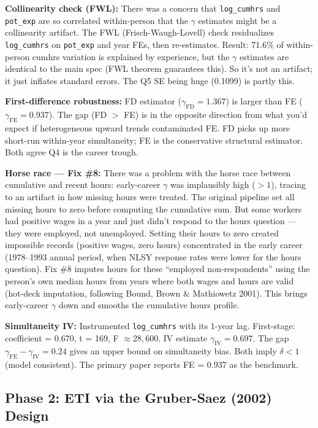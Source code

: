 \documentclass[11pt, letterpaper]{article}
\newcommand{\codebox}[1]{\texttt{\small #1}}
\begin{document}
\textbf{Collinearity check (FWL):} There was a concern that \codebox{log\_cumhrs} and \codebox{pot\_exp} are so correlated within-person that the $\gamma$ estimates might be a collinearity artifact. The FWL (Frisch-Waugh-Lovell) check residualizes \codebox{log\_cumhrs} on \codebox{pot\_exp} and year FEs, then re-estimates. Result: 71.6\% of within-person cumhrs variation is explained by experience, but the $\gamma$ estimates are identical to the main spec (FWL theorem guarantees this). So it's not an artifact; it just inflates standard errors. The Q5 SE being huge (0.1099) is partly this.

\textbf{First-difference robustness:} FD estimator ($\gamma_\text{FD} = 1.367$) is larger than FE ($\gamma_\text{FE} = 0.937$). The gap (FD $>$ FE) is in the opposite direction from what you'd expect if heterogeneous upward trends contaminated FE. FD picks up more short-run within-year simultaneity; FE is the conservative structural estimator. Both agree Q4 is the career trough.

\textbf{Horse race --- Fix \#8:} There was a problem with the horse race between cumulative and recent hours: early-career $\gamma$ was implausibly high ($> 1$), tracing to an artifact in how missing hours were treated. The original pipeline set all missing hours to zero before computing the cumulative sum. But some workers had positive wages in a year and just didn't respond to the hours question --- they were employed, not unemployed. Setting their hours to zero created impossible records (positive wages, zero hours) concentrated in the early career (1978--1993 annual period, when NLSY response rates were lower for the hours question). Fix \#8 imputes hours for these ``employed non-respondents'' using the person's own median hours from years where both wages and hours are valid (hot-deck imputation, following Bound, Brown \& Mathiowetz 2001). This brings early-career $\gamma$ down and smooths the cumulative hours profile.

\textbf{Simultaneity IV:} Instrumented \codebox{log\_cumhrs} with its 1-year lag. First-stage: coefficient = 0.670, t = 169, F $\approx 28{,}600$. IV estimate $\gamma_\text{IV} = 0.697$. The gap $\gamma_\text{FE} - \gamma_\text{IV} = 0.24$ gives an upper bound on simultaneity bias. Both imply $\delta < 1$ (model consistent). The primary paper reports FE = 0.937 as the benchmark.

\subsection{Phase 2: ETI via the Gruber-Saez (2002) Design}
\end{document}
